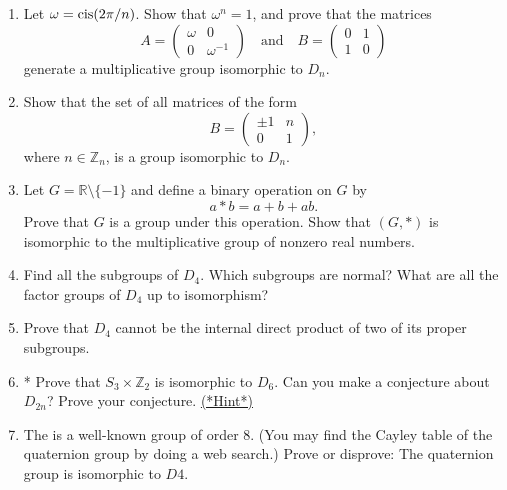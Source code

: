 {\small
\begin{enumerate}[(1)]
 
 
\item
Let $\omega = \operatorname{cis}(2 \pi /n)$.  Show that $\omega^n = 1$, and  prove that the matrices 
\[
A=
\begin{pmatrix}
\omega & 0 \\
0 & \omega^{-1}
\end{pmatrix}
\quad \text{and} \quad
B =
\begin{pmatrix}
0 & 1 \\
1 & 0
\end{pmatrix}
\]
generate a multiplicative group isomorphic to $D_n$.
 

\item
Show that the set of all matrices of the form
\[
B =
\begin{pmatrix}
\pm 1 & n \\
0 & 1
\end{pmatrix},
\]
where $n \in {\mathbb Z}_n$, is a group isomorphic to $D_n$. 


\item
Let $G = {\mathbb R} \setminus \{ -1 \}$ and define a binary operation on
$G$ by 
\[
a \ast b = a + b + ab.
\]
Prove that $G$ is a group under this operation. Show that $(G, *)$ is
isomorphic to the multiplicative group of nonzero real numbers.
  
\item
Find all the subgroups of $D_4$. Which subgroups are normal? What are
all the factor groups of $D_4$ up to isomorphism?


\item
Prove that $D_4$ cannot be the internal direct product of two of its
proper subgroups. 
 

\item \label{exercise:isomorph:eoc}
* Prove that $S_3 \times {\mathbb Z}_2$ is isomorphic to $D_6$. Can you
make a conjecture about $D_{2n}$? Prove your conjecture. 
\hyperref[sec:isomorph:hints]{(*Hint*)}
 

\item
The  is a well-known group of order 8.  (You may find the Cayley table of the quaternion group by doing a web search.)  Prove or disprove:  The quaternion group is isomorphic to $D4$. 



\end{enumerate}}
